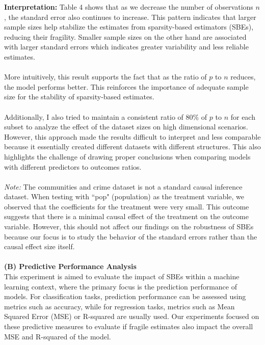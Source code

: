 \textbf{Interpretation:} Table 4 shows that as we decrease the number of observations $n$, the standard error also continues to increase. This pattern indicates that larger sample sizes help stabilize the estimates from sparsity-based estimators (SBEs), reducing their fragility. Smaller sample sizes on the other hand are associated with larger standard errors which indicates greater variability and less reliable estimates. \\
\\
More intuitively, this result supports the fact that as the ratio of $p$ to $n$ reduces, the model performs better. This reinforces the importance of adequate sample size for the stability of sparsity-based estimates.\\
\\
Additionally, I also tried to maintain a consistent ratio of 80\% of $p$ to $n$ for each subset to analyze the effect of the dataset sizes on high dimensional scenarios. However, this approach made the results difficult to interpret and less comparable because it essentially created different datasets with different structures. This also highlights the challenge of drawing proper conclusions when comparing models with different predictors to outcomes ratios.\\
\\
\textit{Note:} The communities and crime dataset is not a standard causal inference dataset. When testing with ``pop" (population) as the treatment variable, we observed that the coefficients for the treatment were very small. This outcome suggests that there is a minimal causal effect of the treatment on the outcome variable. However, this should not affect our findings on the robustness of SBEs because our focus is to study the behavior of the standard errors rather than the causal effect size itself.\\
\\
\textbf{(B) Predictive Performance Analysis }\\
This experiment is aimed to evaluate the impact of SBEs within a machine learning context, where the primary focus is the prediction performance of models. For classification tasks, prediction performance can be assessed using metrics such as accuracy, while for regression tasks, metrics such as Mean Squared Error (MSE) or R-squared are usually used. Our experiments focused on these predictive measures to evaluate if fragile estimates also impact the overall MSE and R-squared of the model.
